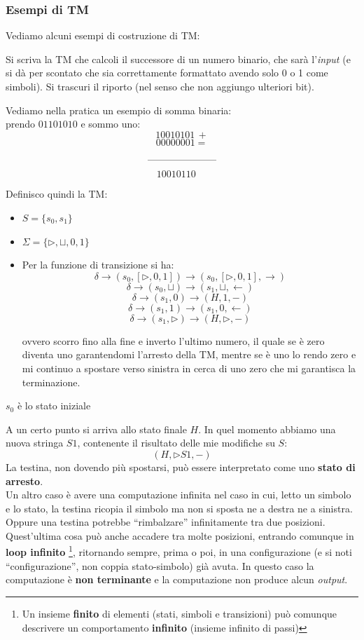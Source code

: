 \subsubsection{Esempi di TM}
Vediamo alcuni esempi di costruzione di TM:
\begin{esempio}
  Si scriva la TM che calcoli il successore di un numero binario, che sarà
  l'\textit{input} (e si dà per scontato che sia correttamente formattato avendo solo 0 o
  1 come simboli). Si trascuri il riporto (nel senso che non aggiungo ulteriori
  bit).\\
  \begin{shaded}
    Vediamo nella pratica un esempio di somma binaria:\\
    prendo $01101010$ e sommo uno:
    \[10010101 \, +\]
    \[00000001=\]
    \[\rule{70pt}{.4pt}\]
    \[10010110\,\,\,\,\,\,\,\]
  \end{shaded}
  Definisco quindi la TM:
  \begin{itemize}
    \item $S=\{s_0,s_1\}$
    \item $\Sigma =\{\triangleright, \sqcup, 0,1\}$
    \item Per la funzione di transizione si ha:
    \[\delta\to(s_0,[\triangleright, 0,1])\to(s_0,[\triangleright, 0,1],
      \rightarrow)\]
    \[\delta\to(s_0,\sqcup)\to(s_1,\sqcup,\leftarrow)\]
    \[\delta\to(s_1,0)\to(H,1,-)\]
    \[\delta\to(s_1,1)\to(s_1,0,\leftarrow)\]
    \[\delta\to(s_1,\triangleright)\to(H,\triangleright,-)\]

    ovvero scorro fino alla fine e inverto l'ultimo numero, il quale se è zero diventa uno garantendomi 
    l'arresto della TM, mentre se è uno lo rendo zero e mi continuo a spostare verso sinistra in cerca di
    uno zero che mi garantisca la terminazione.
  \end{itemize}
    \item $s_0$ è lo stato iniziale
\end{esempio}
A un certo punto si arriva allo stato finale $H$. In quel momento abbiamo
una nuova stringa $S1$, contenente il risultato delle mie modifiche su $S$:
\[(H,\triangleright S1, -)\]
La testina, non dovendo più spostarsi, può essere interpretato come uno \textbf{stato di arresto}.\\
Un altro caso è avere una computazione infinita nel caso in cui, letto un
simbolo e lo stato, la testina ricopia il simbolo ma non si sposta ne a destra
ne a sinistra. Oppure una testina potrebbe ``rimbalzare'' infinitamente tra due
posizioni. Quest'ultima cosa può anche accadere tra molte posizioni, entrando
comunque in \textbf{loop infinito} \footnote{Un insieme \textbf{finito} di elementi (stati, simboli e transizioni) può comunque descrivere un comportamento \textbf{infinito} (insieme infinito di passi)}, ritornando sempre, prima o poi, in una
configurazione (e si noti ``configurazione'', non coppia stato-simbolo) già
avuta. In questo caso la computazione è \textbf{non terminante} e la
computazione non produce alcun \textit{output}. \\

